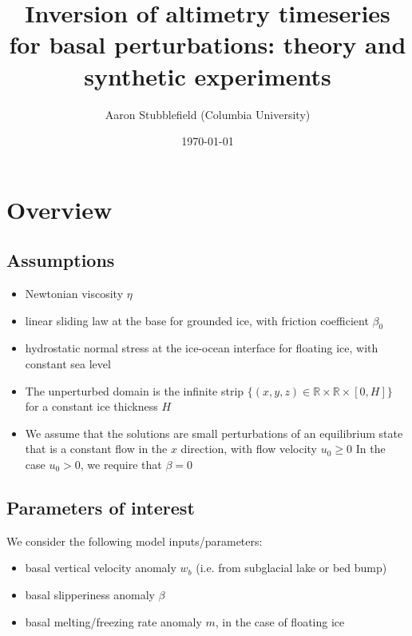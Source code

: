 \documentclass[paper=a4, fontsize=11pt]{article}
\title{
Inversion of altimetry timeseries for basal perturbations: theory
and synthetic experiments
}
\author{ Aaron Stubblefield (Columbia University)} %
\date{\small\today} %
\begin{document}
\maketitle %

\section*{Overview}

\subsection*{Assumptions}
\begin{itemize}
\item Newtonian viscosity $\eta$
\item linear sliding law at the base for grounded ice, with friction coefficient $\beta_0$
\item hydrostatic normal stress at the ice-ocean interface for floating ice, with constant sea level
\item The unperturbed domain is the infinite strip $\{(x,y,z)\in\mathbb{R}\times\mathbb{R}\times[0,H]\}$ for a
constant ice thickness $H$
\item We assume that the solutions are small perturbations of an equilibrium state
that is a constant flow in the $x$ direction, with flow velocity $u_0\geq 0$
In the case $u_0>0$, we require that $\beta=0$
\end{itemize}

\subsection*{Parameters of interest}
We consider the following model inputs/parameters:
\begin{itemize}
\item basal vertical velocity anomaly $w_b$ (i.e. from subglacial lake or bed bump)
\item basal slipperiness anomaly $\beta$
\item basal melting/freezing rate anomaly $m$, in the case of floating ice
\end{itemize}
\end{document}
